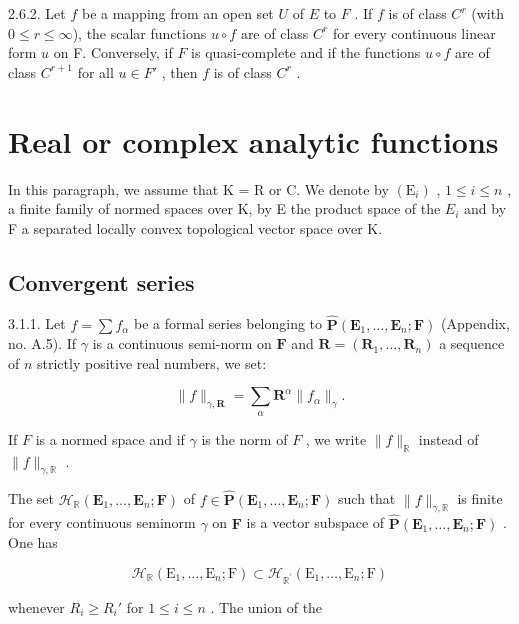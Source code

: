 2.6.2. Let \(f\) be a mapping from an open set \(U\) of \(E\) to \(F\) . If \(f\) is of class \(C^r\) (with \(0 \leqslant r \leqslant \infty\)), the scalar functions \(u \circ f\) are of class \(C^r\) for every continuous linear form \(u\) on F. Conversely, if \(F\) is quasi-complete and if the functions \(u \circ f\) are of class \(C^{r+1}\) for all \(u \in F'\) , then \(f\) is of class \(C^r\) .

\section{Real or complex analytic functions}

In this paragraph, we assume that K = R or C. We denote by \((\mathrm{E}_{i})\) , \(1 \leqslant i \leqslant n\) , a finite family of normed spaces over K, by E the product space of the \(E_{i}\) and by F a separated locally convex topological vector space over K.

\subsection{Convergent series}

3.1.1. Let \(f = \sum f_{\alpha}\) be a formal series belonging to \(\hat{\mathbf{P}}(\mathbf{E}_1, \ldots, \mathbf{E}_n; \mathbf{F})\) (Appendix, no. A.5). If \(\gamma\) is a continuous semi-norm on \(\mathbf{F}\) and \(\mathbf{R} = (\mathbf{R}_1, \ldots, \mathbf{R}_n)\) a sequence of \(n\) strictly positive real numbers, we set:

\[
\| f \| _ {\gamma , \mathbf {R}} = \sum_ {\alpha} \mathbf {R} ^ {\alpha} \| f _ {\alpha} \| _ {\gamma}.
\]

If \(F\) is a normed space and if \(\gamma\) is the norm of \(F\) , we write \(\| f \|_{\mathbb{R}}\) instead of \(\| f \|_{\gamma, \mathbb{R}}\) .

The set \(\mathcal{H}_{\mathbb{R}}(\mathbf{E}_{1},\ldots,\mathbf{E}_{n};\mathbf{F})\) of \(f\in\hat{\mathbf{P}}(\mathbf{E}_{1},\ldots,\mathbf{E}_{n};\mathbf{F})\) such that \(\|f\|_{\gamma,\mathbb{R}}\) is finite for every continuous seminorm \(\gamma\) on \(\mathbf{F}\) is a vector subspace of \(\hat{\mathbf{P}}(\mathbf{E}_{1},\ldots,\mathbf{E}_{n};\mathbf{F})\) . One has

\[
\mathcal {H} _ {\mathbb {R}} (\mathrm{E} _ {1}, \dots , \mathrm{E} _ {n}; \mathrm{F}) \subset \mathcal {H} _ {\mathbb {R} ^ {\prime}} (\mathrm{E} _ {1}, \dots , \mathrm{E} _ {n}; \mathrm{F})
\]

whenever \(R_{i} \geqslant R_{i}'\) for \(1 \leqslant i \leqslant n\) . The union of the

